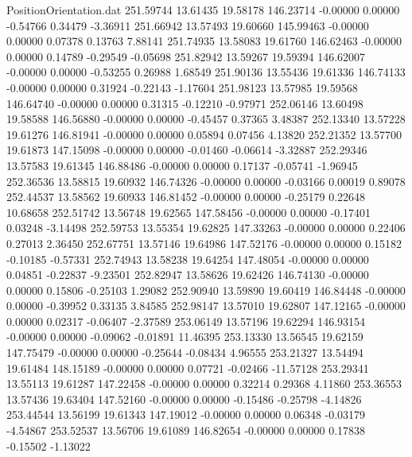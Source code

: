 \begin{filecontents}{PositionOrientation.dat}
 251.59744   13.61435   19.58178   146.23714   -0.00000    0.00000   -0.54766    0.34479   -3.36911
 251.66942   13.57493   19.60660   145.99463   -0.00000    0.00000    0.07378    0.13763    7.88141
 251.74935   13.58083   19.61760   146.62463   -0.00000    0.00000    0.14789   -0.29549   -0.05698
 251.82942   13.59267   19.59394   146.62007   -0.00000    0.00000   -0.53255    0.26988    1.68549
 251.90136   13.55436   19.61336   146.74133   -0.00000    0.00000    0.31924   -0.22143   -1.17604
 251.98123   13.57985   19.59568   146.64740   -0.00000    0.00000    0.31315   -0.12210   -0.97971
 252.06146   13.60498   19.58588   146.56880   -0.00000    0.00000   -0.45457    0.37365    3.48387
 252.13340   13.57228   19.61276   146.81941   -0.00000    0.00000    0.05894    0.07456    4.13820
 252.21352   13.57700   19.61873   147.15098   -0.00000    0.00000   -0.01460   -0.06614   -3.32887
 252.29346   13.57583   19.61345   146.88486   -0.00000    0.00000    0.17137   -0.05741   -1.96945
 252.36536   13.58815   19.60932   146.74326   -0.00000    0.00000   -0.03166    0.00019    0.89078
 252.44537   13.58562   19.60933   146.81452   -0.00000    0.00000   -0.25179    0.22648   10.68658
 252.51742   13.56748   19.62565   147.58456   -0.00000    0.00000   -0.17401    0.03248   -3.14498
 252.59753   13.55354   19.62825   147.33263   -0.00000    0.00000    0.22406    0.27013    2.36450
 252.67751   13.57146   19.64986   147.52176   -0.00000    0.00000    0.15182   -0.10185   -0.57331
 252.74943   13.58238   19.64254   147.48054   -0.00000    0.00000    0.04851   -0.22837   -9.23501
 252.82947   13.58626   19.62426   146.74130   -0.00000    0.00000    0.15806   -0.25103    1.29082
 252.90940   13.59890   19.60419   146.84448   -0.00000    0.00000   -0.39952    0.33135    3.84585
 252.98147   13.57010   19.62807   147.12165   -0.00000    0.00000    0.02317   -0.06407   -2.37589
 253.06149   13.57196   19.62294   146.93154   -0.00000    0.00000   -0.09062   -0.01891   11.46395
 253.13330   13.56545   19.62159   147.75479   -0.00000    0.00000   -0.25644   -0.08434    4.96555
 253.21327   13.54494   19.61484   148.15189   -0.00000    0.00000    0.07721   -0.02466  -11.57128
 253.29341   13.55113   19.61287   147.22458   -0.00000    0.00000    0.32214    0.29368    4.11860
 253.36553   13.57436   19.63404   147.52160   -0.00000    0.00000   -0.15486   -0.25798   -4.14826
 253.44544   13.56199   19.61343   147.19012   -0.00000    0.00000    0.06348   -0.03179   -4.54867
 253.52537   13.56706   19.61089   146.82654   -0.00000    0.00000    0.17838   -0.15502   -1.13022

\end{filecontents}
